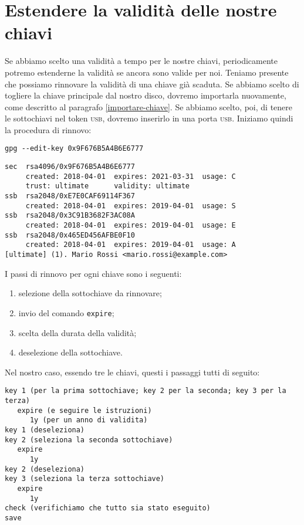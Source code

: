 \chapter{Estendere la validità delle nostre chiavi}

Se abbiamo scelto una validità a tempo per le nostre chiavi, periodicamente
potremo estenderne la validità se ancora sono valide per noi. Teniamo presente
che possiamo rinnovare la validità di una chiave già scaduta. Se abbiamo scelto
di togliere la chiave principale dal nostro disco, dovremo importarla
nuovamente, come descritto al paragrafo \vref{importare-chiave}. Se abbiamo
scelto, poi, di tenere le sottochiavi nel token \textsc{usb}, dovremo inserirlo
in una porta \textsc{usb}. Iniziamo quindi la procedura di rinnovo:

\begin{lstlisting}
gpg --edit-key 0x9F676B5A4B6E6777
\end{lstlisting}

\begin{lstlisting}
sec  rsa4096/0x9F676B5A4B6E6777
     created: 2018-04-01  expires: 2021-03-31  usage: C
     trust: ultimate      validity: ultimate
ssb  rsa2048/0xE7E0CAF69114F367
     created: 2018-04-01  expires: 2019-04-01  usage: S
ssb  rsa2048/0x3C91B3682F3AC08A
     created: 2018-04-01  expires: 2019-04-01  usage: E
ssb  rsa2048/0x465ED456AFBE0F10
     created: 2018-04-01  expires: 2019-04-01  usage: A
[ultimate] (1). Mario Rossi <mario.rossi@example.com>
\end{lstlisting}

I passi di rinnovo per ogni chiave sono i seguenti:

\begin{enumerate}
    \item selezione della sottochiave da rinnovare;
    \item invio del comando \texttt{expire};
    \item scelta della durata della validità;
    \item deselezione della sottochiave.
\end{enumerate}

Nel nostro caso, essendo tre le chiavi, questi i passaggi tutti di seguito:

\begin{lstlisting}
key 1 (per la prima sottochiave; key 2 per la seconda; key 3 per la terza)
   expire (e seguire le istruzioni)
      1y (per un anno di validita)
key 1 (deseleziona)
key 2 (seleziona la seconda sottochiave)
   expire
      1y
key 2 (deseleziona)
key 3 (seleziona la terza sottochiave)
   expire
      1y
check (verifichiamo che tutto sia stato eseguito)
save
\end{lstlisting}
